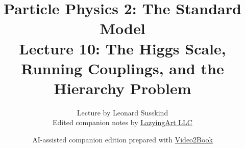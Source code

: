 \documentclass[11pt,oneside]{book}
\begin{document}
\frontmatter
\title{Particle Physics 2: The Standard Model\\Lecture 10: The Higgs Scale, Running Couplings, and the Hierarchy Problem}
\author{Lecture by Leonard Susskind\\Edited companion notes by \href{https://lazying.art}{LazyingArt LLC}}
\date{AI-assisted companion edition prepared with \href{https://github.com/lachlanchen/Video2Book}{Video2Book}}
\maketitle
\clearpage
\mainmatter

\end{document}
